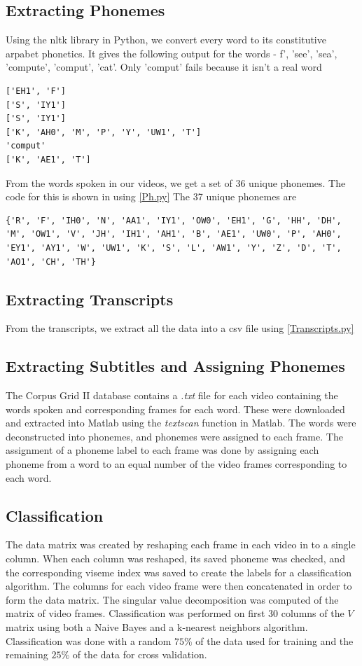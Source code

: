 \documentclass[a4paper]{article}
\begin{document}
\subsection{Extracting Phonemes}

Using the nltk library in Python, we convert every word to its constitutive arpabet phonetics. It gives the following output for the words - f', 'see', 'sea', 'compute', 'comput', 'cat'. Only 'comput' fails because it isn't a real word
\begin{verbatim}
['EH1', 'F']
['S', 'IY1']
['S', 'IY1']
['K', 'AH0', 'M', 'P', 'Y', 'UW1', 'T']
'comput'
['K', 'AE1', 'T']
\end{verbatim}

From the words spoken in our videos, we get a set of 36 unique phonemes. The code for this is shown in using \ref{Ph.py} The 37 unique phonemes are 

\begin{verbatim}
{'R', 'F', 'IH0', 'N', 'AA1', 'IY1', 'OW0', 'EH1', 'G', 'HH', 'DH', 'M', 'OW1', 'V', 'JH', 'IH1', 'AH1', 'B', 'AE1', 'UW0', 'P', 'AH0', 'EY1', 'AY1', 'W', 'UW1', 'K', 'S', 'L', 'AW1', 'Y', 'Z', 'D', 'T', 'AO1', 'CH', 'TH'}
\end{verbatim}


\subsection{Extracting Transcripts}

From the transcripts, we extract all the data into a csv file using \ref{Transcripts.py}

\subsection{Extracting Subtitles and Assigning Phonemes}
The Corpus Grid II database contains a {\it .txt} file for each video containing the words spoken and corresponding frames for each word.  These were downloaded and extracted into Matlab using the {\it textscan} function in Matlab.  The words were deconstructed into phonemes, and phonemes were assigned to each frame.  The assignment of a phoneme label to each frame was done by assigning each phoneme from a word to an equal number of the video frames corresponding to each word. 

\subsection{Classification}
The data matrix was created by reshaping each frame in each video in to a single column.  When each column was reshaped, its saved phoneme was checked, and the corresponding viseme index was saved to create the labels for a classification algorithm. The columns for each video frame were then concatenated in order to form the data matrix.  The singular value decomposition was computed of the matrix of video frames.  Classification was performed on first 30 columns of the $V$ matrix using both a Naive Bayes and a k-nearest neighbors algorithm.  Classification was done with a random $75\%$ of the data used for training and the remaining $25\%$ of the data for cross validation.
\end{document}
